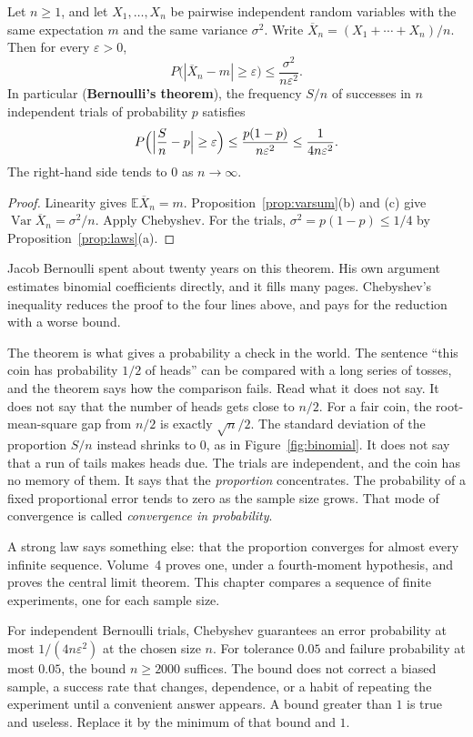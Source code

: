 \begin{theorem}\label{thm:wlln}
Let $n\ge1$, and let $X_1,\ldots,X_n$ be pairwise independent random variables with the same expectation $m$ and the same variance $\sigma^2$. Write $\overline X_n=(X_1+\cdots+X_n)/n$. Then for every $\varepsilon>0$,
\[
 P\bigl(|\overline X_n-m|\ge\varepsilon\bigr)\le\frac{\sigma^2}{n\varepsilon^2}.
\]
In particular (\textbf{Bernoulli's theorem}), the frequency $S/n$ of successes in $n$ independent trials of probability $p$ satisfies
\[
 P\Bigl(\Bigl|\frac Sn-p\Bigr|\ge\varepsilon\Bigr)
 \le\frac{p(1-p)}{n\varepsilon^2}
 \le\frac1{4n\varepsilon^2}.
\]
The right-hand side tends to $0$ as $n\to\infty$.
\end{theorem}
\begin{proof}
Linearity gives $\mathbb E\overline X_n=m$. Proposition~\ref{prop:varsum}(b) and (c) give $\operatorname{Var}\overline X_n=\sigma^2/n$. Apply Chebyshev. For the trials, $\sigma^2=p(1-p)\le1/4$ by Proposition~\ref{prop:laws}(a).
\end{proof}

Jacob Bernoulli spent about twenty years on this theorem. His own argument estimates binomial coefficients directly, and it fills many pages. Chebyshev's inequality reduces the proof to the four lines above, and pays for the reduction with a worse bound.

The theorem is what gives a probability a check in the world. The sentence ``this coin has probability $1/2$ of heads'' can be compared with a long series of tosses, and the theorem says how the comparison fails. Read what it does not say. It does not say that the number of heads gets close to $n/2$. For a fair coin, the root-mean-square gap from $n/2$ is exactly $\sqrt n/2$. The standard deviation of the proportion $S/n$ instead shrinks to $0$, as in Figure~\ref{fig:binomial}. It does not say that a run of tails makes heads due. The trials are independent, and the coin has no memory of them. It says that the \emph{proportion} concentrates. The probability of a fixed proportional error tends to zero as the sample size grows. That mode of convergence is called \emph{convergence in probability}.

A strong law says something else: that the proportion converges for almost every infinite sequence. Volume~4 proves one, under a fourth-moment hypothesis, and proves the central limit theorem. This chapter compares a sequence of finite experiments, one for each sample size.

\begin{reminder}
For independent Bernoulli trials, Chebyshev guarantees an error probability at most $1/(4n\varepsilon^2)$ at the chosen size $n$. For tolerance $0.05$ and failure probability at most $0.05$, the bound $n\ge2000$ suffices. The bound does not correct a biased sample, a success rate that changes, dependence, or a habit of repeating the experiment until a convenient answer appears. A bound greater than $1$ is true and useless. Replace it by the minimum of that bound and $1$.
\end{reminder}

